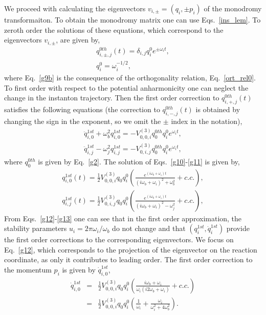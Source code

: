 \documentclass[journal=jpcafh,manuscript=article]{achemso}
\begin{document}
We proceed with calculating the eigenvectors $v_{i,\pm}=(q_i,\pm p_i)$
of the monodromy transformaiton. To obtain the monodromy matrix one
can use Eqs.~\ref{ins_lem}.  To zeroth order the solutions of
these equations, which correspond to the eigenvectors
$v_{i,\pm}$, are given by,
\begin{eqnarray}
  \label{g9a}
  q^{0th}_{i,\pm,j}(t)=\delta_{i,j}q_i^0e^{\pm\omega_it},
  \\
  \label{g9b}
  q_i^0=\omega_i^{-1/2},
\end{eqnarray}
where Eq.~\ref{g9b} is the consequence of the orthogonality relation,
Eq.~\ref{ort_rel0}. To first order with respect to the potential
anharmonicity one can neglect the change in the instanton
trajectory. Then the first order correction to $q^{0th}_{i,+,j}(t)$
satisfies the following equations (the correction to
$q^{0th}_{i,-,j}(t)$ is obtained by changing the sign in the exponent,
so we omit the $\pm$ index in the notation),
\begin{eqnarray}
  \label{g10}
  \ddot{q}^{1st}_{i,0}+\omega_b^2q^{1st}_{i,0}=-V^{(3)}_{0,0,i}q_0^{0th}q_i^0e^{\omega_it},
  \\
  \label{g11}
  \ddot{q}^{1st}_{i,j}-\omega_j^2q^{1st}_{i,j}=-V^{(3)}_{0,i,j}q_0^{0th}q_i^0e^{\omega_it},
\end{eqnarray}
where $q_0^{0th}$ is given by Eq.~\ref{g2}. 
The solution of Eqs.~\ref{g10}-\ref{g11} is
given by,
\begin{eqnarray}
  \label{g12}
  q^{1st}_{i,0}(t)=\frac{1}{2}V^{(3)}_{0,0,i}q_0q_i^0\left(\frac{e^{(i\omega_b+\omega_i)t}}{(i\omega_b+\omega_i)^2+\omega_b^2}+c.c.\right),
  \\
  \label{g13}
  q^{1st}_{i,j}(t)=\frac{1}{2}V^{(3)}_{0,i,j}q_0q_i^0\left(\frac{e^{(i\omega_b+\omega_i)t}}{(i\omega_b+\omega_i)^2-\omega_j^2}+c.c.\right),
\end{eqnarray}
From Eqs.~\ref{g12}-\ref{g13} one can see that in the first order
approximation, the stability parameters $u_i=2\pi\omega_i/\omega_b$ do
not change and that $(q_i^{1st},\dot{q}_i^{1st})$ provide the first
order corrections to the corresponding eigenvectors.  We focus on
Eq.~\ref{g12}, which corresponds to the projection of the eigenvector
on the reaction coordinate, as only it contributes to leading
order. The first order correction to the momentum $p_i$ is given by
$\dot{q}_{i,0}^{1st}$,
\begin{eqnarray}
  \nonumber
  \dot{q}_{i,0}^{1st}&=&\frac{1}{2}V^{(3)}_{0,0,i}q_0q_i^0\left(\frac{i\omega_b+\omega_i}{\omega_i(i2\omega_b+\omega_i)}+c.c.\right)
  \\
  \label{g14}
                     &=&\frac{1}{2}V^{(3)}_{0,0,i}q_0q_i^0\left(\frac{1}{\omega_i}+\frac{\omega_i}{\omega_i^2+4\omega_b^2}\right).
\end{eqnarray}
\end{document}
